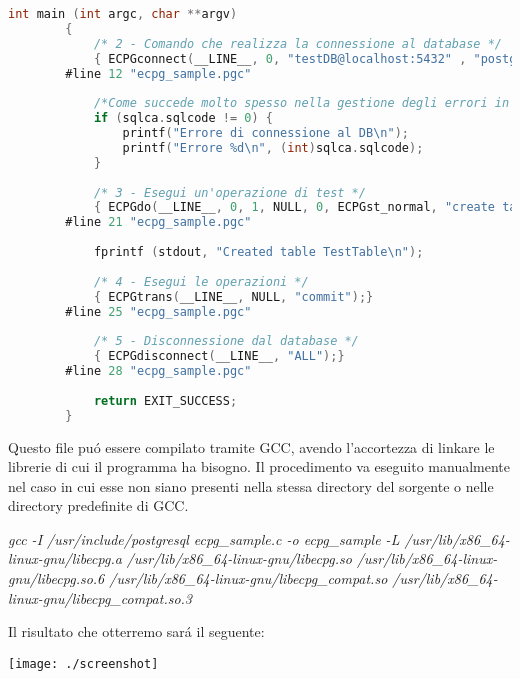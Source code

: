 \documentclass[12pt,a4paper,onecolumn,x11names]{article}
\begin{document}
\begin{lstlisting}[language=C, caption=testECPG.c]
		int main (int argc, char **argv)
		{
			/* 2 - Comando che realizza la connessione al database */
			{ ECPGconnect(__LINE__, 0, "testDB@localhost:5432" , "postgres" , "portento123" , NULL, 0); }
		#line 12 "ecpg_sample.pgc"
			
			/*Come succede molto spesso nella gestione degli errori in linguaggio C, il valore ritornato da una funzione viene utilizzato anche come codice di errore, considerando lo 0 come esecuzione andata a buon fine */
			if (sqlca.sqlcode != 0)	{
				printf("Errore di connessione al DB\n");
				printf("Errore %d\n", (int)sqlca.sqlcode);
			}
			
			/* 3 - Esegui un'operazione di test */
			{ ECPGdo(__LINE__, 0, 1, NULL, 0, ECPGst_normal, "create table TableTest ( number integer , ascii char ( 16 ) )", ECPGt_EOIT, ECPGt_EORT);}
		#line 21 "ecpg_sample.pgc"
		
			fprintf (stdout, "Created table TestTable\n");
			
			/* 4 - Esegui le operazioni */
			{ ECPGtrans(__LINE__, NULL, "commit");}
		#line 25 "ecpg_sample.pgc"
		
			/* 5 - Disconnessione dal database */
			{ ECPGdisconnect(__LINE__, "ALL");}
		#line 28 "ecpg_sample.pgc"
			
			return EXIT_SUCCESS;
		}
	\end{lstlisting}
	\begin{flushleft}
		Questo file pu\'{o} essere compilato tramite GCC, avendo l'accortezza di linkare le librerie di cui il programma ha bisogno. Il procedimento va eseguito manualmente nel caso in cui esse non siano presenti nella stessa directory del sorgente o nelle directory predefinite di GCC.
	\end{flushleft}
	\begin{center}
	\textit{gcc -I /usr/include/postgresql ecpg\_sample.c -o ecpg\_sample -L /usr/lib/x86\_64-linux-gnu/libecpg.a /usr/lib/x86\_64-linux-gnu/libecpg.so /usr/lib/x86\_64-linux-gnu/libecpg.so.6 /usr/lib/x86\_64-linux-gnu/libecpg\_compat.so /usr/lib/x86\_64-linux-gnu/libecpg\_compat.so.3}
	\end{center}
	\begin{flushleft}
	Il risultato che otterremo sar\'{a} il seguente:
	\end{flushleft}
	\begin{center}
	\texttt{[image: ./screenshot]}
	\end{center}
	
\end{document}
